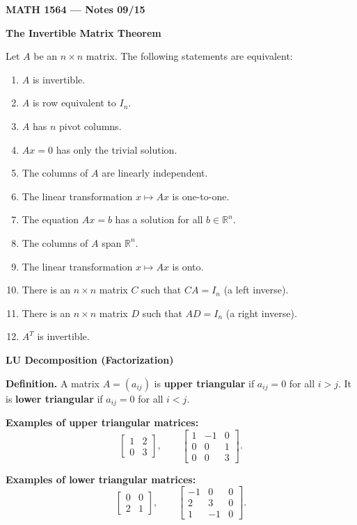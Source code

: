 \documentclass{article}
\begin{document}
\textbf{MATH 1564 --- Notes 09/15}

\bigskip

\textbf{The Invertible Matrix Theorem}

\medskip

Let $A$ be an $n \times n$ matrix. The following statements are equivalent:
\begin{enumerate}
\item $A$ is invertible.
\item $A$ is row equivalent to $I_n$.
\item $A$ has $n$ pivot columns.
\item $Ax = 0$ has only the trivial solution.
\item The columns of $A$ are linearly independent.
\item The linear transformation $x \mapsto Ax$ is one-to-one.
\item The equation $Ax=b$ has a solution for all $b \in \mathbb{R}^n$.
\item The columns of $A$ span $\mathbb{R}^n$.
\item The linear transformation $x \mapsto Ax$ is onto.
\item There is an $n \times n$ matrix $C$ such that $CA=I_n$ (a left inverse).
\item There is an $n \times n$ matrix $D$ such that $AD=I_n$ (a right inverse).
\item $A^T$ is invertible.
\end{enumerate}

\newpage

\textbf{LU Decomposition (Factorization)}

\medskip

\textbf{Definition.} A matrix $A=(a_{ij})$ is \textbf{upper triangular} if $a_{ij}=0$ for all $i>j$. It is \textbf{lower triangular} if $a_{ij}=0$ for all $i<j$.

\medskip

\textbf{Examples of upper triangular matrices:}
\[
\begin{bmatrix}1&2\\0&3\end{bmatrix},
\qquad
\begin{bmatrix}1&-1&0\\0&0&1\\0&0&3\end{bmatrix}.
\]

\textbf{Examples of lower triangular matrices:}
\[
\begin{bmatrix}0&0\\2&1\end{bmatrix},
\qquad
\begin{bmatrix}-1&0&0\\2&3&0\\1&-1&0\end{bmatrix}.
\]
\end{document}
